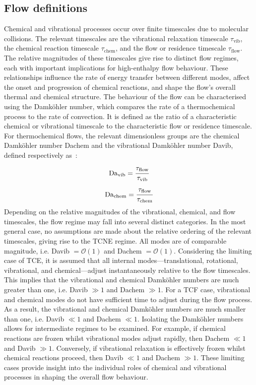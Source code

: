 \subsection{Flow definitions}
Chemical and vibrational processes occur over finite timescales due to molecular collisions. The relevant timescales are the vibrational relaxation timescale $\tau_{\mathrm{vib}}$, the chemical reaction timescale $\tau_{\mathrm{chem}}$, and the flow or residence timescale $\tau_{\mathrm{flow}}$. The relative magnitudes of these timescales give rise to distinct flow regimes, each with important implications for high-enthalpy flow behaviour. These relationships influence the rate of energy transfer between different modes, affect the onset and progression of chemical reactions, and shape the flow's overall thermal and chemical structure. The behaviour of the flow can be characterised using the Damköhler number, which compares the rate of a thermochemical process to the rate of convection. It is defined as the ratio of a characteristic chemical or vibrational timescale to the characteristic flow or residence timescale. For thermochemical flows, the relevant dimensionless groups are the chemical Damköhler number \gls{Dachem} and the vibrational Damköhler number \gls{Davib}, defined respectively as~\citep{miromiroThesis}:
\begin{equation}\label{equation:davib}
    \mathrm{Da}_{\mathrm{vib}} = \cfrac{\tau_{\mathrm{flow}}}{\tau_{\mathrm{vib}}}
\end{equation}
\begin{equation}\label{equation:dachem}
    \mathrm{Da}_{\mathrm{chem}} = \cfrac{\tau_{\mathrm{flow}}}{\tau_{\mathrm{chem}}}
\end{equation}
Depending on the relative magnitudes of the vibrational, chemical, and flow timescales, the flow regime may fall into several distinct categories. In the most general case, no assumptions are made about the relative ordering of the relevant timescales, giving rise to the \gls{TCNE} regime. All modes are of comparable magnitude, i.e. \gls{Davib} $= \mathcal{O}(1)$ and \gls{Dachem} $= \mathcal{O}(1)$. Considering the limiting case of \gls{TCE}, it is assumed that all internal modes---translational, rotational, vibrational, and chemical---adjust instantaneously relative to the flow timescales. This implies that the vibrational and chemical Damköhler numbers are much greater than one, i.e. \gls{Davib} $\gg 1$ and \gls{Dachem} $\gg 1$. For a \gls{TCF} case, vibrational and chemical modes do not have sufficient time to adjust during the flow process. As a result, the vibrational and chemical Damköhler numbers are much smaller than one, i.e. \gls{Davib} $\ll 1$ and \gls{Dachem} $\ll 1$. Isolating the Damköhler numbers allows for intermediate regimes to be examined. For example, if chemical reactions are frozen whilst vibrational modes adjust rapidly, then \gls{Dachem} $\ll 1$ and \gls{Davib} $\gg 1$. Conversely, if vibrational relaxation is effectively frozen whilst chemical reactions proceed, then \gls{Davib} $\ll 1$ and \gls{Dachem} $\gg 1$. These limiting cases provide insight into the individual roles of chemical and vibrational processes in shaping the overall flow behaviour.

